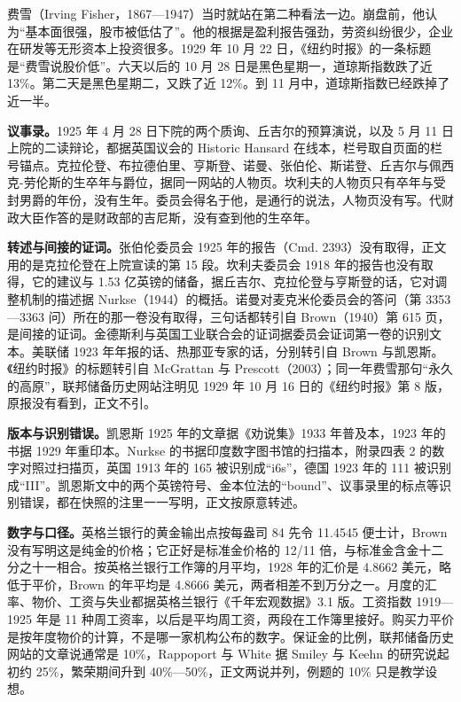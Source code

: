 费雪（Irving Fisher，1867—1947）当时就站在第二种看法一边。崩盘前，他认为“基本面很强，股市被低估了”\cite{mcgrattan2003}。他的根据是盈利报告强劲，劳资纠纷很少，企业在研发等无形资本上投资很多\cite{mcgrattan2003}。1929 年 10 月 22 日，《纽约时报》的一条标题是“费雪说股价低”\cite{mcgrattan2003}。六天以后的 10 月 28 日是黑色星期一，道琼斯指数跌了近 13\%。第二天是黑色星期二，又跌了近 12\%。到 11 月中，道琼斯指数已经跌掉了近一半\cite{frh2013}。

\begin{deeper}[史料说明]
\textbf{议事录。}1925 年 4 月 28 日下院的两个质询、丘吉尔的预算演说，以及 5 月 11 日上院的二读辩论，都据英国议会的 Historic Hansard 在线本，栏号取自页面的栏号锚点。克拉伦登、布拉德伯里、亨斯登、诺曼、张伯伦、斯诺登、丘吉尔与佩西克-劳伦斯的生卒年与爵位，据同一网站的人物页。坎利夫的人物页只有卒年与受封男爵的年份，没有生年。委员会得名于他，是通行的说法，人物页没有写。代财政大臣作答的是财政部的吉尼斯，没有查到他的生卒年。

\textbf{转述与间接的证词。}张伯伦委员会 1925 年的报告（Cmd. 2393）没有取得，正文用的是克拉伦登在上院宣读的第 15 段。坎利夫委员会 1918 年的报告也没有取得，它的建议与 1.53 亿英镑的储备，据丘吉尔、克拉伦登与亨斯登的话，它对调整机制的描述据 Nurkse（1944）的概括。诺曼对麦克米伦委员会的答问（第 3353—3363 问）所在的那一卷没有取得，三句话都转引自 Brown（1940）第 615 页，是间接的证词。金德斯利与英国工业联合会的证词据委员会证词第一卷的识别文本。美联储 1923 年年报的话、热那亚专家的话，分别转引自 Brown 与凯恩斯。《纽约时报》的标题转引自 McGrattan 与 Prescott（2003）；同一年费雪那句“永久的高原”，联邦储备历史网站注明见 1929 年 10 月 16 日的《纽约时报》第 8 版，原报没有看到，正文不引。

\textbf{版本与识别错误。}凯恩斯 1925 年的文章据《劝说集》1933 年普及本，1923 年的书据 1929 年重印本。Nurkse 的书据印度数字图书馆的扫描本，附录四表 2 的数字对照过扫描页，英国 1913 年的 165 被识别成“i6s”，德国 1923 年的 111 被识别成“III”。凯恩斯文中的两个英镑符号、金本位法的“bound”、议事录里的标点等识别错误，都在快照的注里一一写明，正文按原意转述。

\textbf{数字与口径。}英格兰银行的黄金输出点按每盎司 84 先令 11.4545 便士计，Brown 没有写明这是纯金的价格；它正好是标准金价格的 12/11 倍，与标准金含金十二分之十一相合。按英格兰银行工作簿的月平均，1928 年的汇价是 4.8662 美元，略低于平价，Brown 的年平均是 4.8666 美元，两者相差不到万分之一。月度的汇率、物价、工资与失业都据英格兰银行《千年宏观数据》3.1 版。工资指数 1919—1925 年是 11 种周工资率，以后是平均周工资，两段在工作簿里接好。购买力平价是按年度物价的计算，不是哪一家机构公布的数字。保证金的比例，联邦储备历史网站的文章说通常是 10\%，Rappoport 与 White 据 Smiley 与 Keehn 的研究说起初约 25\%，繁荣期间升到 40\%—50\%，正文两说并列，例题的 10\% 只是教学设想。


\end{deeper}
